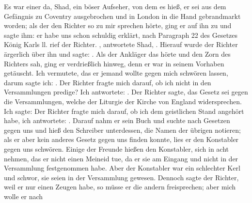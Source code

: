 Es war einer da, Shad, ein böser Aufseher, von dem es hieß,
er sei aus dem Gefängnis zu Coventry 
ausgebrochen und in
London in die Hand gebrandmarkt worden; als der den Richter
so zu mir sprechen hörte, ging er auf ihn zu und sagte ihm: er
habe uns schon schuldig erklärt, nach Paragraph 22 des Gesetzes
König Karls ll.  rief der
Richter. , antwortete Shad, . Hierauf wurde
der Richter ärgerlich über ihn und sagte: .
Als der Ankläger das hörte und den Zorn des Richters sah,
ging er verdrießlich hinweg, denn er war in seinem Vorhaben
getäuscht. Ich vermutete, das er jemand wollte gegen mich
schwören lassen, darum sagte ich: . Der Richter
fragte mich darauf, ob ich nicht in den Versammlungen predige?
Ich antwortete: . Der Richter sagte, das Gesetz sei gegen die Versammlungen, 
welche der Liturgie der Kirche von England widersprechen.
Ich sagte:  Der Richter fragte mich darauf, ob ich dem geistlichen 
Stand angehört habe, ich antwortete: . Darauf
nahm er sein Buch und suchte nach Gesetzen gegen uns und hieß
den Schreiber unterdessen, die Namen der übrigen notieren; als
er aber kein anderes Gesetz gegen uns finden konnte, lies er den
Konstabler gegen uns schwören. Einige der Freunde hießen den
Konstabler, sich in acht nehmen, das er nicht einen Meineid tue,
da er sie am Eingang und nicht in der Versammlung festgenommen 
habe. Aber der Konstabler war ein schlechter Kerl und
schwor, sie seien in der Versammlung gewesen.
Dennoch sagte der Richter, weil er nur einen Zeugen habe,
so müsse er die andern freisprechen; aber mich wolle er nach
